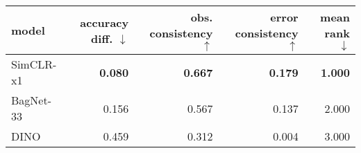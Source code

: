 \begin{tabular}{lrrrr}
\toprule
    model & accuracy diff. $\downarrow$ & obs. consistency $\uparrow$ & error consistency $\uparrow$ & mean rank $\downarrow$ \\
\midrule
SimCLR-x1 &              \textbf{0.080} &              \textbf{0.667} &               \textbf{0.179} &         \textbf{1.000} \\
BagNet-33 &                       0.156 &                       0.567 &                        0.137 &                  2.000 \\
     DINO &                       0.459 &                       0.312 &                        0.004 &                  3.000 \\
\bottomrule
\end{tabular}

